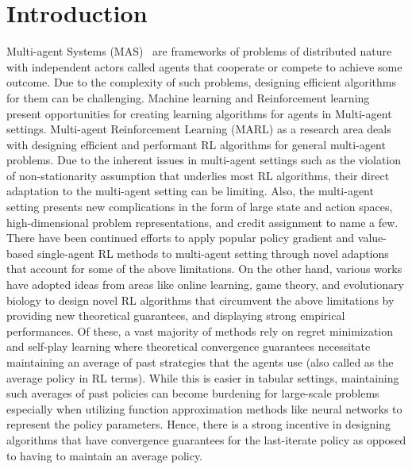 \chapter{Introduction}

Multi-agent Systems (MAS)~\cite{tuylsMultiagent2012} are frameworks of problems of distributed
nature with independent actors called agents that cooperate or compete to achieve some outcome.
Due to the complexity of such problems, designing efficient algorithms for them can be challenging.
Machine learning and Reinforcement learning present opportunities for creating learning algorithms
for agents in Multi-agent settings.
Multi-agent Reinforcement Learning (MARL) as a research area deals with designing efficient and
performant RL algorithms for general multi-agent problems.
Due to the inherent issues in multi-agent settings such as the violation of non-stationarity assumption that underlies most RL algorithms, their direct adaptation to the multi-agent setting
can be limiting.
Also, the multi-agent setting presents new complications in the form of large state and action
spaces, high-dimensional problem representations, and credit assignment to name a few.
There have been continued efforts to apply popular policy gradient and value-based single-agent RL
methods to multi-agent setting through novel adaptions that account for some of the above
limitations.
On the other hand, various works have adopted ideas from areas like online learning, game theory,
and evolutionary biology to design novel RL algorithms that circumvent the above limitations by
providing new theoretical guarantees, and displaying strong empirical performances.
Of these, a vast majority of methods rely on regret minimization and self-play learning where
theoretical convergence guarantees necessitate maintaining an average of past strategies that the
agents use (also called as the average policy in RL terms).
While this is easier in tabular settings, maintaining such averages of past policies can become
burdening for large-scale problems especially when utilizing function approximation methods like
neural networks to represent the policy parameters.
Hence, there is a strong incentive in designing algorithms that have convergence guarantees for the
last-iterate policy as opposed to having to maintain an average policy.

